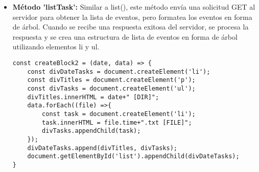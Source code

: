 \documentclass{article}
\begin{document}
\begin{itemize}
\item{\textbf{Método 'listTask':} Similar a list(), este método envía una solicitud GET al servidor para obtener la lista de eventos, pero formatea los eventos en forma de árbol. Cuando se recibe una respuesta exitosa del servidor, se procesa la respuesta y se crea una estructura de lista de eventos en forma de árbol utilizando elementos li y ul.} 
\begin{lstlisting}[style=ascii-tree]
const createBlock2 = (date, data) => {
    const divDateTasks = document.createElement('li');
    const divTitles = document.createElement('p');
    const divTasks = document.createElement('ul');
    divTitles.innerHTML = date+" [DIR]";
    data.forEach((file) =>{
        const task = document.createElement('li');
        task.innerHTML = file.time+".txt [FILE]";
        divTasks.appendChild(task);
    });
    divDateTasks.append(divTitles, divTasks);
    document.getElementById('list').appendChild(divDateTasks);
}
\end{lstlisting}
\end{itemize}
\end{document}
